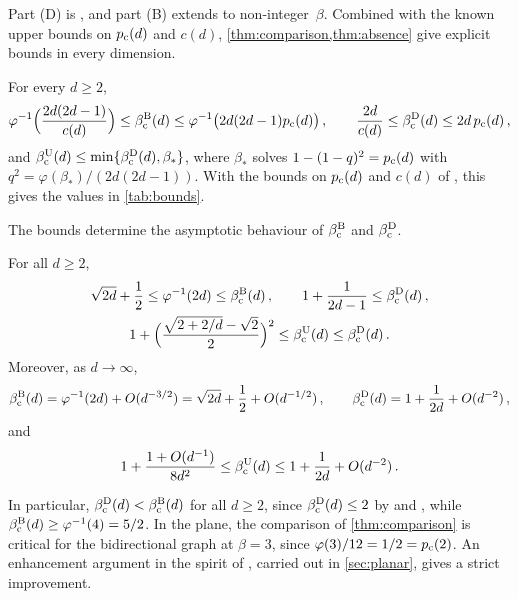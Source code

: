 \documentclass[11pt,letterpaper]{article}
\begin{document}
Part (D) is \cite[Lemma~2.2]{CHJK26}, and part (B) extends \cite[Lemma~2.6]{JKLT25} to non-integer~$\beta$. Combined with the known upper bounds on $p_{\mathrm c}(d)$ and $c(d)$, \cref{thm:comparison,thm:absence} give explicit bounds in every dimension.

\begin{theorem}\label{thm:bounds}
For every $d\ge2$,
\begin{equation*}
\varphi^{-1}\Big(\frac{2d(2d-1)}{c(d)}\Big)\le\beta_{\mathrm c}^{\mathrm B}(d)\le\varphi^{-1}\big(2d(2d-1)p_{\mathrm c}(d)\big)\,,\qquad\frac{2d}{c(d)}\le\beta_{\mathrm c}^{\mathrm D}(d)\le2d\,p_{\mathrm c}(d)\,,
\end{equation*}
and $\beta_{\mathrm c}^{\mathrm U}(d)\le\min\{\beta_{\mathrm c}^{\mathrm D}(d),\beta_*\}$, where $\beta_*$ solves $1-(1-q)^2=p_{\mathrm c}(d)$ with $q^2=\varphi(\beta_*)/(2d(2d-1))$. With the bounds on $p_{\mathrm c}(d)$ and $c(d)$ of \cite{GPS26,FvdH17,PT00}, this gives the values in \cref{tab:bounds}.
\end{theorem}





The bounds determine the asymptotic behaviour of $\beta_{\mathrm c}^{\mathrm B}$ and $\beta_{\mathrm c}^{\mathrm D}$.

\begin{theorem}\label{thm:asymptotics}
For all $d\ge2$,
\begin{gather*}
\sqrt{2d}+\frac12\le\varphi^{-1}(2d)\le\beta_{\mathrm c}^{\mathrm B}(d)\,,\qquad 1+\frac1{2d-1}\le\beta_{\mathrm c}^{\mathrm D}(d)\,,\\
1+\Big(\frac{\sqrt{2+2/d}-\sqrt2}{2}\Big)^2\le\beta_{\mathrm c}^{\mathrm U}(d)\le\beta_{\mathrm c}^{\mathrm D}(d)\,.
\end{gather*}
Moreover, as $d\to\infty$,
\begin{equation*}
\beta_{\mathrm c}^{\mathrm B}(d)=\varphi^{-1}(2d)+O(d^{-3/2})=\sqrt{2d}+\frac12+O(d^{-1/2})\,,\qquad\beta_{\mathrm c}^{\mathrm D}(d)=1+\frac1{2d}+O(d^{-2})\,,
\end{equation*}
and
\begin{equation*}
1+\frac{1+O(d^{-1})}{8d^2}\le\beta_{\mathrm c}^{\mathrm U}(d)\le1+\frac1{2d}+O(d^{-2})\,.
\end{equation*}
\end{theorem}

In particular, $\beta_{\mathrm c}^{\mathrm D}(d)<\beta_{\mathrm c}^{\mathrm B}(d)$ for all $d\ge2$, since $\beta_{\mathrm c}^{\mathrm D}(d)\le2$ by \cite[Theorem~2.3]{CHJK26} and \cite[Theorem~1.1]{LXZ26}, while $\beta_{\mathrm c}^{\mathrm B}(d)\ge\varphi^{-1}(4)=5/2$. In the plane, the comparison of \cref{thm:comparison} is critical for the bidirectional graph at $\beta=3$, since $\varphi(3)/12=1/2=p_{\mathrm c}(2)$. An enhancement argument in the spirit of \cite{AG91}, carried out in \cref{sec:planar}, gives a strict improvement.
\end{document}
